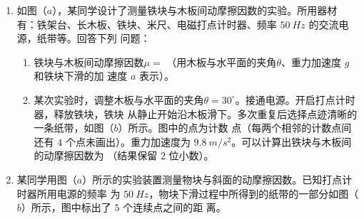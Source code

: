 \begin{enumerate}
\renewcommand{\labelenumi}{\arabic{enumi}.}
\item
{}
如图（$ a $），某同学设计了测量铁块与木板间动摩擦因数的实验。所用器材
有：铁架台、长木板、铁块、米尺、电磁打点计时器、频率 $ 50 \ Hz $ 的交流电源，纸带等。回答下列
问题：
\begin{enumerate}
\renewcommand{\labelenumi}{\arabic{enumi}.}
\item
铁块与木板间动摩擦因数$ \mu = $  （用木板与水平面的夹角$ \theta $、重力加速度 $ g $ 和铁块下滑的加
速度 $ a $ 表示）。
\begin{figure}[h!]
\centering

\end{figure}


\item 
某次实验时，调整木板与水平面的夹角$ \theta =30 ^{ \circ } $。接通电源。开启打点计时器，释放铁块，铁块
从静止开始沿木板滑下。多次重复后选择点迹清晰的一条纸带，如图（$ b $）所示。图中的点为计数
点（每两个相邻的计数点间还有 $ 4 $ 个点未画出）。重力加速度为 $ 9.8 \ m/s^{2} $。可以计算出铁块与木板间
的动摩擦因数为  （结果保留 $ 2 $ 位小数）。
\begin{figure}[h!]
\centering

\end{figure}

\end{enumerate}



\newpage
\item 
{}
某同学用图（$ a $）所示的实验装置测量物块与斜面的动摩擦因数。已知打点计时器所用电源的频率
为 $ 50 \ Hz $，物块下滑过程中所得到的纸带的一部分如图（$ b $）所示，图中标出了 $ 5 $ 个连续点之间的距
离。
\begin{figure}[h!]
\centering

\end{figure}



\end{enumerate}
